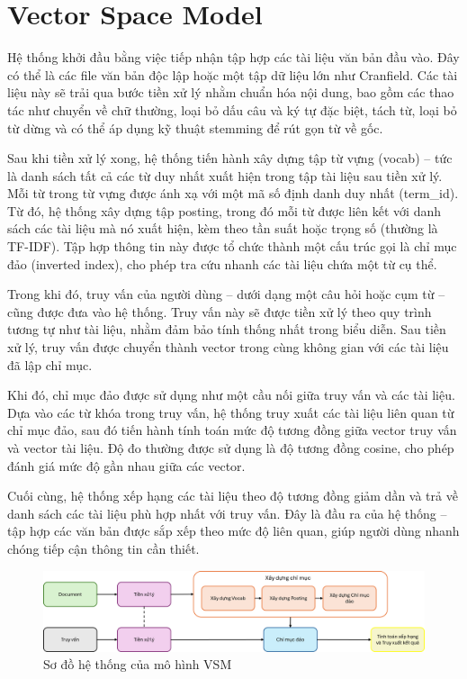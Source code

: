 \section{Vector Space Model}
Hệ thống khởi đầu bằng việc tiếp nhận tập hợp các tài liệu văn bản đầu vào. Đây có thể là các file văn bản độc lập hoặc một tập dữ liệu lớn như Cranfield. Các tài liệu này sẽ trải qua bước tiền xử lý nhằm chuẩn hóa nội dung, bao gồm các thao tác như chuyển về chữ thường, loại bỏ dấu câu và ký tự đặc biệt, tách từ, loại bỏ từ dừng và có thể áp dụng kỹ thuật stemming để rút gọn từ về gốc.

Sau khi tiền xử lý xong, hệ thống tiến hành xây dựng tập từ vựng (vocab) -- tức là danh sách tất cả các từ duy nhất xuất hiện trong tập tài liệu sau tiền xử lý. Mỗi từ trong từ vựng được ánh xạ với một mã số định danh duy nhất (term\_id). Từ đó, hệ thống xây dựng tập posting, trong đó mỗi từ được liên kết với danh sách các tài liệu mà nó xuất hiện, kèm theo tần suất hoặc trọng số (thường là TF-IDF). Tập hợp thông tin này được tổ chức thành một cấu trúc gọi là chỉ mục đảo (inverted index), cho phép tra cứu nhanh các tài liệu chứa một từ cụ thể.

Trong khi đó, truy vấn của người dùng -- dưới dạng một câu hỏi hoặc cụm từ -- cũng được đưa vào hệ thống. Truy vấn này sẽ được tiền xử lý theo quy trình tương tự như tài liệu, nhằm đảm bảo tính thống nhất trong biểu diễn. Sau tiền xử lý, truy vấn được chuyển thành vector trong cùng không gian với các tài liệu đã lập chỉ mục.

Khi đó, chỉ mục đảo được sử dụng như một cầu nối giữa truy vấn và các tài liệu. Dựa vào các từ khóa trong truy vấn, hệ thống truy xuất các tài liệu liên quan từ chỉ mục đảo, sau đó tiến hành tính toán mức độ tương đồng giữa vector truy vấn và vector tài liệu. Độ đo thường được sử dụng là độ tương đồng cosine, cho phép đánh giá mức độ gần nhau giữa các vector.

Cuối cùng, hệ thống xếp hạng các tài liệu theo độ tương đồng giảm dần và trả về danh sách các tài liệu phù hợp nhất với truy vấn. Đây là đầu ra của hệ thống -- tập hợp các văn bản được sắp xếp theo mức độ liên quan, giúp người dùng nhanh chóng tiếp cận thông tin cần thiết.

\begin{figure}[H]
    \caption{Sơ đồ hệ thống của mô hình VSM}
    \begin{center}
        \includegraphics[width=\linewidth]{assets/vsm-flowchart.png}
    \end{center}
\end{figure}

